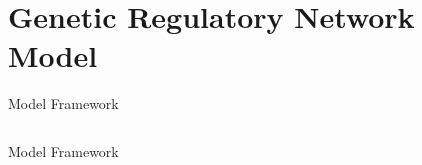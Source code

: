 \section{Genetic Regulatory Network Model}

\begin{frame}{Model Framework}
\begin{columns}
\begin{column}{0.5\textwidth}

\end{column}

\begin{column}{0.5\textwidth}

\end{column}

\end{columns}
\end{frame}

\begin{frame}{Model Framework}

\end{frame}

